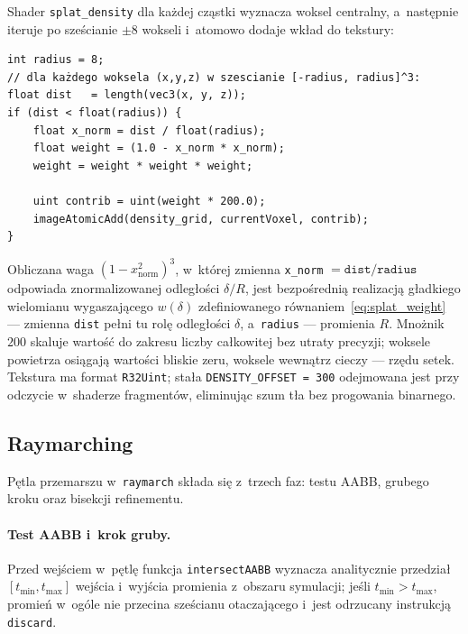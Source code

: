 Shader \texttt{splat\_density} dla każdej cząstki wyznacza woksel centralny,
a~następnie iteruje po sześcianie $\pm 8$ wokseli i~atomowo dodaje wkład do tekstury:

\begin{lstlisting}[caption={Shader \texttt{splat\_density} --- waga woksela i~zapis atomowy},
                   label=lst:splat,]
int radius = 8;
// dla każdego woksela (x,y,z) w szescianie [-radius, radius]^3:
float dist   = length(vec3(x, y, z));
if (dist < float(radius)) {
    float x_norm = dist / float(radius);
    float weight = (1.0 - x_norm * x_norm);
    weight = weight * weight * weight;

    uint contrib = uint(weight * 200.0);
    imageAtomicAdd(density_grid, currentVoxel, contrib);
}
\end{lstlisting}

Obliczana waga $(1 - x_{\mathrm{norm}}^2)^3$, w~której zmienna \texttt{x\_norm} $= \texttt{dist}/\texttt{radius}$ odpowiada znormalizowanej odległości $\delta/R$, jest bezpośrednią realizacją gładkiego wielomianu wygaszającego $w(\delta)$ zdefiniowanego równaniem~\ref{eq:splat_weight} --- zmienna \texttt{dist} pełni tu rolę odległości $\delta$, a~\texttt{radius} --- promienia $R$.
Mnożnik $200$ skaluje wartość do zakresu liczby całkowitej bez utraty precyzji;
woksele powietrza osiągają wartości bliskie zeru, woksele wewnątrz cieczy --- rzędu
setek.
Tekstura ma format \texttt{R32Uint}; stała \texttt{DENSITY\_OFFSET = 300} odejmowana
jest przy odczycie w~shaderze fragmentów, eliminując szum tła bez progowania binarnego.

\subsection{Raymarching}
\label{subsec:raymarching}

Pętla przemarszu w~\texttt{raymarch} składa się z~trzech faz: testu AABB,
grubego kroku oraz bisekcji refinementu.

\paragraph{Test AABB i~krok gruby.}
Przed wejściem w~pętlę funkcja \texttt{intersectAABB} wyznacza analitycznie
przedział $[t_{\min}, t_{\max}]$ wejścia i~wyjścia promienia z~obszaru symulacji;
jeśli $t_{\min} > t_{\max}$, promień w~ogóle nie przecina sześcianu otaczającego i~jest odrzucany instrukcją \texttt{discard}.


